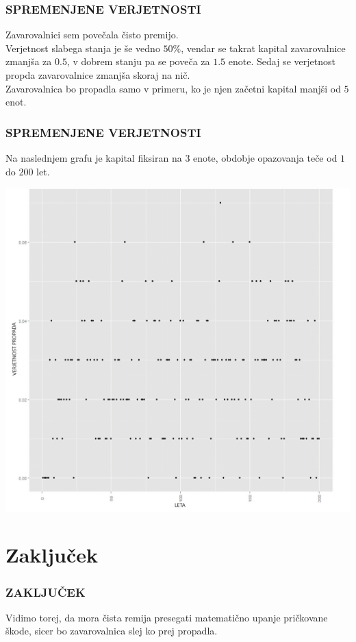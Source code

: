 \documentclass{beamer}
\begin{document}
\begin{frame}
	\frametitle{SPREMENJENE VERJETNOSTI}
	Zavarovalnici sem povečala čisto premijo. \\
	\vspace{0.2cm}
	Verjetnost slabega stanja je še vedno $50\%$, vendar se takrat kapital zavarovalnice zmanjša za $0.5$, v dobrem stanju pa se poveča za $1.5$ enote. Sedaj se verjetnost propda zavarovalnice zmanjša skoraj na nič.\\
	\vspace{0.2cm}
	Zavarovalnica bo propadla samo v primeru, ko je njen začetni kapital manjši od $5$ enot. 
\end{frame}

\begin{frame}
	\frametitle{SPREMENJENE VERJETNOSTI}
	Na naslednjem grafu je kapital fiksiran na $3$ enote, obdobje opazovanja teče od $1$ do $200$ let.
	\begin{center}
		\includegraphics[scale=0.20]{graf2.jpg}  
	\end{center}
\end{frame}

\section{Zaključek}
\begin{frame}
	\frametitle{ZAKLJUČEK}
	\begin{alertblock}{}
	Vidimo torej, da mora čista remija presegati matematično upanje pričkovane škode, sicer bo zavarovalnica slej ko prej propadla.
	\end{alertblock}
\end{frame}
\end{document}
